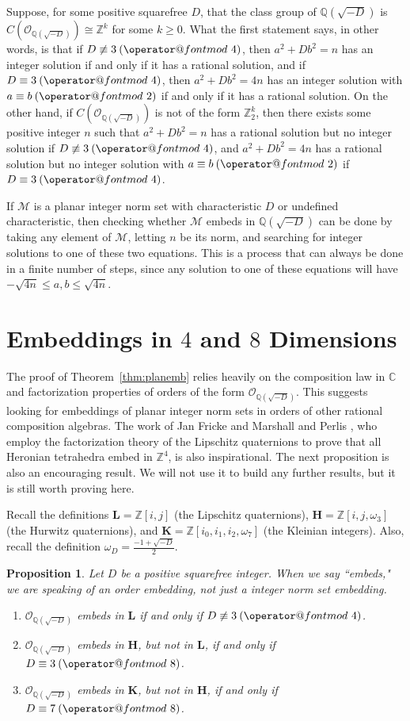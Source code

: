 \documentclass[10pt]{amsart}
\makeatletter
\newcommand{\M}{\mathcal{M}}
\newcommand{\Q}{\mathbb{Q}}
\newcommand{\Z}{\mathbb{Z}}
\newcommand{\C}{\mathbb{C}}
\renewcommand{\L}{\mathbf{L}}
\newcommand{\HH}{\mathbf{H}}
\newcommand{\K}{\mathbf{K}}
\newcommand{\omd}{\omega_{\scriptscriptstyle D}}
\newcommand{\thering}{\mathcal{O}_{\Q(\sqrt{-D})}}
\newtheorem{prop}[thm]{Proposition}
\DeclareRobustCommand{\pmod}{\@pmods}
\def\@pmods#1{\mkern4mu({\operator@font mod}\mkern 6mu#1)}
\makeatother
\begin{document}
Suppose, for some positive squarefree $D$, that the class group of $\Q(\sqrt{-D})$ is $C(\thering) \cong \Z^k$ for some $k \geq 0$.  What the first statement says, in other words, is that if $D \not \equiv 3 \pmod{4}$, then $a^2 + Db^2 = n$ has an integer solution if and only if it has a rational solution, and if $D \equiv 3 \pmod{4}$, then $a^2 + Db^2 = 4n$ has an integer solution with $a \equiv b \pmod{2}$ if and only if it has a rational solution.  On the other hand, if $C(\thering)$ is not of the form $\Z_2^k$, then there exists some positive integer $n$ such that $a^2 + Db^2 = n$ has a rational solution but no integer solution if $D \not \equiv 3 \pmod{4}$, and $a^2 + Db^2 = 4n$ has a rational solution but no integer solution with $a \equiv b \pmod{2}$ if $D \equiv 3 \pmod{4}$.

If $\M$ is a planar integer norm set with characteristic $D$ or undefined characteristic, then checking whether $\M$ embeds in $\Q(\sqrt{-D})$ can be done by taking any element of $\M$, letting $n$ be its norm, and searching for integer solutions to one of these two equations.  This is a process that can always be done in a finite number of steps, since any solution to one of these equations will have $-\sqrt{4n} \leq a,b \leq \sqrt{4n}$.



\section{Embeddings in $4$ and $8$ Dimensions}

The proof of Theorem~\ref{thm:planemb} relies heavily on the composition law in $\C$ and factorization properties of orders of the form $\thering$.  This suggests looking for embeddings of planar integer norm sets in orders of other rational composition algebras.  The work of Jan Fricke \cite{Fr01} and Marshall and Perlis \cite{Ma13}, who employ the factorization theory of the Lipschitz quaternions to prove that all Heronian tetrahedra embed in $\Z^4$, is also inspirational.  The next proposition is also an encouraging result.  We will not use it to build any further results, but it is still worth proving here.

Recall the definitions $\L = \Z[i,j]$ (the Lipschitz quaternions), $\HH = \Z[i,j,\omega_3]$ (the Hurwitz quaternions), and $\K = \Z[i_0,i_1,i_2,\omega_7]$ (the Kleinian integers).  Also, recall the definition $\omd = \frac{-1 + \sqrt{-D}}{2}$.

\begin{prop} \label{prop:quadringemb}
\normalfont
Let $D$ be a positive squarefree integer.  When we say ``embeds," we are speaking of an order embedding, not just a integer norm set embedding.
\begin{enumerate}
\item $\thering$ embeds in $\L$ if and only if $D \not \equiv 3 \pmod{4}$.
\item $\thering$ embeds in $\HH$, but not in $\L$, if and only if $D \equiv 3 \pmod{8}$.
\item $\thering$ embeds in $\K$, but not in $\HH$, if and only if $D \equiv 7 \pmod{8}$.
\end{enumerate}
\end{prop}
\end{document}

